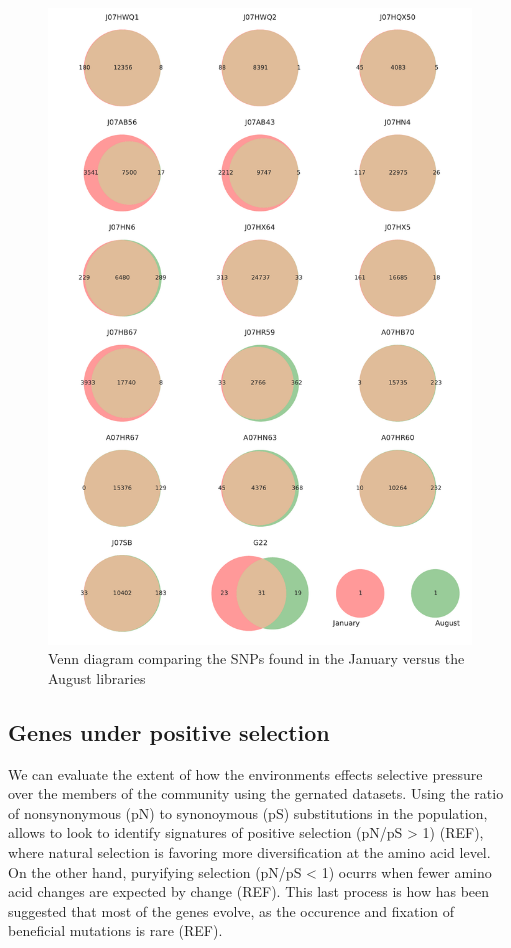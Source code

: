 \begin{figure}[!hbtp]
  \centering
  \includegraphics[width=\textwidth,height=0.9\textheight,keepaspectratio]{Chapter5/Figures/Venn_JanAugSNPs.pdf}
  \caption{Venn diagram comparing the SNPs found in the January versus the August libraries}
  \label{VennBoth}
\end{figure}


\clearpage
\subsection{Genes under positive selection}

We can evaluate the extent of how the environments effects selective pressure over the members of the community using the gernated datasets. Using the ratio of nonsynonymous (pN) to synonoymous (pS) substitutions in the population, allows to look to identify signatures of positive selection (pN/pS > 1) (REF), where natural selection is favoring more diversification at the amino acid level. On the other hand, puryifying selection (pN/pS < 1) ocurrs when fewer amino acid changes are expected by change (REF). This last process is how has been suggested that most of the genes evolve, as the occurence and fixation of beneficial mutations is rare (REF).

